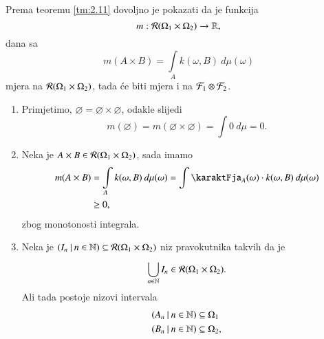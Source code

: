 \iffalse
\begin{rj}[\ref{zad:4.18}]
    Prema teoremu \ref{tm:2.11} dovoljno je pokazati da je funkcija
    \begin{equation*}
        m: \mathcal{R}({\Omega_1 \times \Omega_2}) \to \mathbb{R},
    \end{equation*}
    dana sa
    \begin{equation*}
        m (A \times B) = \int\limits_A k (\omega, B) \: d \mu (\omega)
    \end{equation*}
    mjera na $\mathcal{R}({\Omega_1 \times \Omega_2})$, tada \' ce biti mjera i na $\mathcal{F}_1 \otimes \mathcal{F}_2$.

    \begin{enumerate}[label=(\roman*)]
        \item \label{rj:4.18.1}
            Primjetimo, $\varnothing = \varnothing \times \varnothing$, odakle slijedi
            \begin{equation*}
                m (\varnothing) = m (\varnothing \times \varnothing) = \int 0 \: d \mu = 0.
            \end{equation*}
        \item \label{rj:4.18.2}
            Neka je $A \times B \in \mathcal{R}({\Omega_1 \times \Omega_2})$, sada imamo
            \begin{equation*}
                \begin{aligned}
                    m (A \times B) &= \int\limits_A k (\omega, B) \: d \mu (\omega) = \int \karaktFja_A (\omega) \cdot k (\omega, B) \: d \mu (\omega)\\
                    &\geq 0,
                \end{aligned}
            \end{equation*}
            zbog monotonosti integrala.
        \item \label{rj:4.18.3}
            Neka je $({I_n} \: | \: {n \in \mathbb{N}}) \subseteq \mathcal{R}({\Omega_1 \times \Omega_2})$ niz pravokutnika takvih da je
            \begin{equation*}
                \bigcup\limits_{n \in \mathbb{N}}^{} I_n \in \mathcal{R}({\Omega_1 \times \Omega_2}).
            \end{equation*}
            Ali tada postoje nizovi intervala
            \begin{equation*}
                \begin{aligned}
                    \niz{A_n}{n \in \nat} &\subseteq \Omega_1\\
                    \niz{B_n}{n \in \nat} &\subseteq \Omega_2,

\end{aligned}
\end{equation*}
\end{enumerate}
\end{rj}
